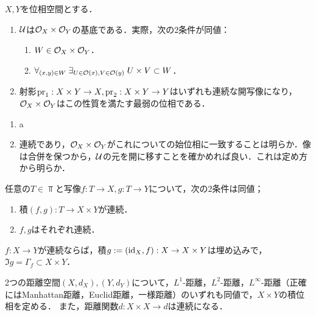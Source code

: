 \documentclass[uplatex,dvipdfmx]{jsreport}
\begin{document}
\begin{proposition}[積位相の特徴付け]
    $X,Y$を位相空間とする．
    \begin{enumerate}
        \item $\mathcal{U}$は$\mathcal{O}_X\times\mathcal{O}_Y$の基底である．実際，次の2条件が同値：
        \begin{enumerate}
            \item $W\in\mathcal{O}_X\times\mathcal{O}_Y$．
            \item $\forall_{(x,y)\in W}\;\exists_{U\in\mathcal{O}(x),V\in\mathcal{O}(y)}\;U\times V\subset W$．
        \end{enumerate}
        \item 射影$\mathrm{pr}_1:X\times Y\to X,\mathrm{pr}_2:X\times Y\to Y$はいずれも連続な開写像になり，$\mathcal{O}_X\times\mathcal{O}_Y$はこの性質を満たす最弱の位相である．
    \end{enumerate}
\end{proposition}
\begin{Proof}\mbox{}
    \begin{enumerate}
        \item a
        \item 連続であり，$\mathcal{O}_X\times\mathcal{O}_Y$がこれについての始位相に一致することは明らか．像は合併を保つから，$\mathcal{U}$の元を開に移すことを確かめれば良い．これは定め方から明らか．
    \end{enumerate}
\end{Proof}

\begin{proposition}[積写像の連続性の特徴付け]
    任意の$T\in\Top$と写像$f:T\to X,g:T\to Y$について，次の2条件は同値；
    \begin{enumerate}
        \item 積$(f,g):T\to X\times Y$が連続．
        \item $f,g$はそれぞれ連続．
    \end{enumerate}
\end{proposition}

\begin{proposition}[連続写像のグラフの埋め込み]
    $f:X\to Y$が連続ならば，積$g:=(\mathrm{id}_X,f):X\to X\times Y$は埋め込みで，$\Im g=\Gamma_f\subset X\times Y$．
\end{proposition}

\begin{example}[距離空間の積]
    2つの距離空間$(X,d_X),(Y,d_Y)$について，$L^1$-距離，$L^2$-距離，$L^\infty$-距離（正確にはManhattan距離，Euclid距離，一様距離）のいずれも同値で，$X\times Y$の積位相を定める．
    また，距離関数$d:X\times X\to d$は連続になる．
\end{example}
\end{document}
